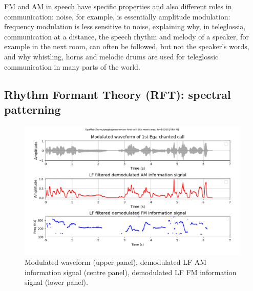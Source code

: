 \documentclass[output=paper,colorlinks,citecolor=brown
]{langscibook}
\begin{document}
FM and AM in speech have specific properties and also different roles in communication: noise, for example, is essentially amplitude modulation: frequency modulation is less sensitive to noise, explaining why, in teleglossia, communication at a distance, the speech rhythm and melody of a speaker, for example in the next room, can often be followed, but not the speaker's words, and why whistling, horns and melodic drums are used for teleglossic communication in many parts of the world.

\subsection{Rhythm Formant Theory (RFT): spectral patterning}

\begin{figure}[ht]
\vspace{-10pt}
\centering
\includegraphics[trim={1.5cm 1.5cm 0 0}, clip, width=0.99\textwidth]{gibbon_figure05.png}
\vspace{-10pt}
\caption{\label{fig:fig05}Modulated waveform (upper panel), demodulated LF AM information signal (centre panel), demodulated LF FM information signal (lower panel).}
\vspace{-10pt}
\end{figure}
\end{document}
